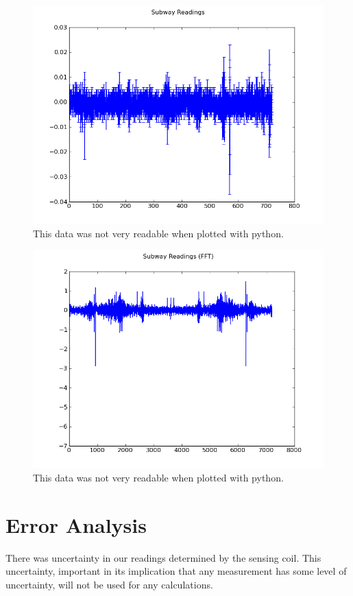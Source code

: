 \documentclass[12pt]{article}
\begin{document}
\begin{figure}[H]
\centering
\hspace{-0.0in}\includegraphics[scale=0.60]{Subway.png}
\caption{This data was not very readable when plotted with python. \label{fig:setup}}
\end{figure}

\begin{figure}[H]
\centering
\hspace{-0.0in}\includegraphics[scale=0.60]{SubwayFFT.png}
\caption{This data was not very readable when plotted with python. \label{fig:setup}}
\end{figure}

\section{Error Analysis}
\indent \indent There was uncertainty in our readings determined by the sensing coil. This uncertainty, important in its implication that any measurement has some level of uncertainty, will not be used for any calculations.
\end{document}
